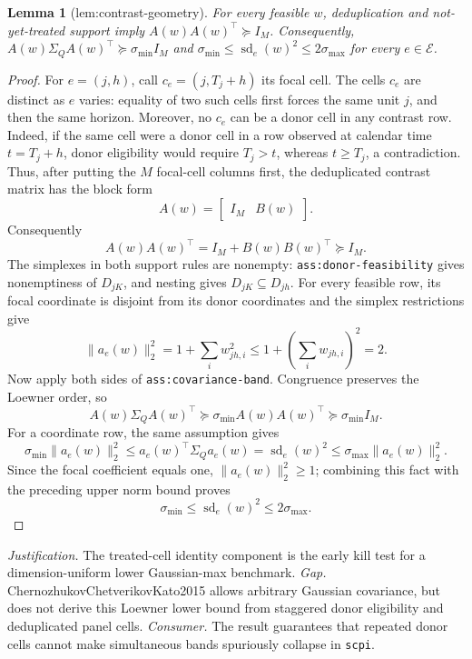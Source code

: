 \documentclass{article}
\newtheorem{lemma}{Lemma}
\begin{document}
\begin{lemma}[lem:contrast-geometry]\label{lem:contrast-geometry}
For every feasible \(w\), deduplication and not-yet-treated support imply \(A(w)A(w)^{\top}\succeq I_M\). Consequently, \(A(w)\Sigma_QA(w)^{\top}\succeq\sigma_{\min}I_M\) and \(\sigma_{\min}\le\operatorname{sd}_e(w)^2\le2\sigma_{\max}\) for every \(e\in\mathcal E\).
\end{lemma}
\begin{proof}
For \(e=(j,h)\), call \(c_e=(j,T_j+h)\) its focal cell.  The cells \(c_e\) are distinct as \(e\) varies: equality of two such cells first forces the same unit \(j\), and then the same horizon.  Moreover, no \(c_e\) can be a donor cell in any contrast row.  Indeed, if the same cell were a donor cell in a row observed at calendar time \(t=T_j+h\), donor eligibility would require \(T_j>t\), whereas \(t\geq T_j\), a contradiction.  Thus, after putting the \(M\) focal-cell columns first, the deduplicated contrast matrix has the block form
\[
A(w)=\begin{bmatrix}I_M&B(w)\end{bmatrix}.
\]
Consequently
\[
A(w)A(w)^{\top}=I_M+B(w)B(w)^{\top}\succeq I_M.
\]
The simplexes in both support rules are nonempty: \texttt{ass:donor-feasibility} gives nonemptiness of \(D_{jK}\), and nesting gives \(D_{jK}\subseteq D_{jh}\).  For every feasible row, its focal coordinate is disjoint from its donor coordinates and the simplex restrictions give
\[
\lVert a_e(w)\rVert_2^2=1+\sum_iw_{jh,i}^2
\leq1+\left(\sum_iw_{jh,i}\right)^2=2.
\]
Now apply both sides of \texttt{ass:covariance-band}.  Congruence preserves the Loewner order, so
\[
A(w)\Sigma_QA(w)^{\top}
\succeq\sigma_{\min}A(w)A(w)^{\top}
\succeq\sigma_{\min}I_M.
\]
For a coordinate row, the same assumption gives
\[
\sigma_{\min}\lVert a_e(w)\rVert_2^2
\leq a_e(w)^{\top}\Sigma_Qa_e(w)
=\operatorname{sd}_e(w)^2
\leq\sigma_{\max}\lVert a_e(w)\rVert_2^2.
\]
Since the focal coefficient equals one, \(\lVert a_e(w)\rVert_2^2\geq1\); combining this fact with the preceding upper norm bound proves
\[
\sigma_{\min}\leq\operatorname{sd}_e(w)^2\leq2\sigma_{\max}.
\]
\end{proof}
\par\smallskip\noindent \textit{Justification.} The treated-cell identity component is the early kill test for a dimension-uniform lower Gaussian-max benchmark. \textit{Gap.} ChernozhukovChetverikovKato2015 allows arbitrary Gaussian covariance, but does not derive this Loewner lower bound from staggered donor eligibility and deduplicated panel cells. \textit{Consumer.} The result guarantees that repeated donor cells cannot make simultaneous bands spuriously collapse in \texttt{scpi}.
\end{document}
